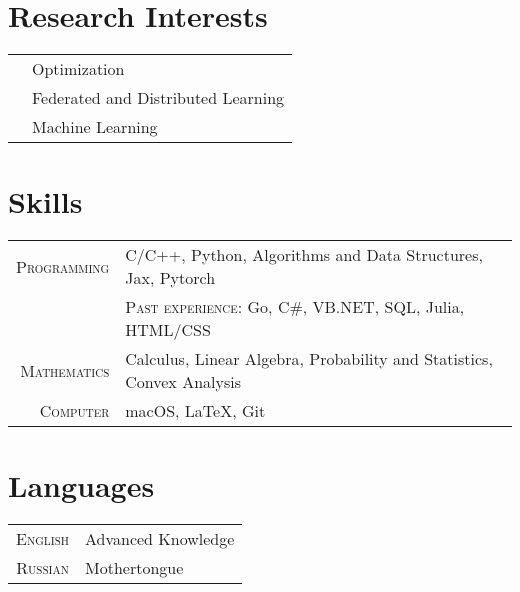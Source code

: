 \section{Research Interests}
\begin{tabular}{cl}
	&  Optimization\\
	& Federated and Distributed Learning\\
	&  Machine Learning
\end{tabular}

\section{Skills}

\begin{tabular}{rl}
	\textsc{Programming} & C/C++, Python, Algorithms and Data Structures, Jax, Pytorch\\
	& \textsc{Past experience:} Go, C\#, VB.NET, SQL, Julia, HTML/CSS\\
	\textsc{Mathematics} & Calculus, Linear Algebra, Probability and Statistics, Convex Analysis\\
	\textsc{Computer} & macOS, LaTeX, Git\\
\end{tabular}

\section{Languages}

\begin{tabular}{rl}
	\textsc{English} & Advanced Knowledge \\
	\textsc{Russian} & Mothertongue\\
\end{tabular}
